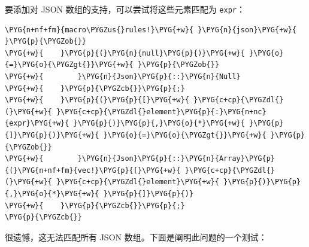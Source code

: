 要添加对 JSON 数组的支持，可以尝试将这些元素匹配为 \texttt{expr}：

\begin{Verbatim}[commandchars=\\\{\},breaklines=true,breakanywhere=true,fontsize=\codefont,xleftmargin=17bp]
\PYG{n+nf+fm}{macro\PYGZus{}rules!}\PYG{+w}{ }\PYG{n}{json}\PYG{+w}{ }\PYG{p}{\PYGZob{}}
\PYG{+w}{    }\PYG{p}{(}\PYG{n}{null}\PYG{p}{)}\PYG{+w}{ }\PYG{o}{=}\PYG{o}{\PYGZgt{}}\PYG{+w}{ }\PYG{p}{\PYGZob{}}
\PYG{+w}{        }\PYG{n}{Json}\PYG{p}{::}\PYG{n}{Null}
\PYG{+w}{    }\PYG{p}{\PYGZcb{}}\PYG{p}{;}
\PYG{+w}{    }\PYG{p}{(}\PYG{p}{[}\PYG{+w}{ }\PYG{c+cp}{\PYGZdl{}(}\PYG{+w}{ }\PYG{c+cp}{\PYGZdl{}element}\PYG{p}{:}\PYG{n+nc}{expr}\PYG{+w}{ }\PYG{p}{)}\PYG{p}{,}\PYG{o}{*}\PYG{+w}{ }\PYG{p}{]}\PYG{p}{)}\PYG{+w}{ }\PYG{o}{=}\PYG{o}{\PYGZgt{}}\PYG{+w}{ }\PYG{p}{\PYGZob{}}
\PYG{+w}{        }\PYG{n}{Json}\PYG{p}{::}\PYG{n}{Array}\PYG{p}{(}\PYG{n+nf+fm}{vec!}\PYG{p}{[}\PYG{+w}{ }\PYG{c+cp}{\PYGZdl{}(}\PYG{+w}{ }\PYG{c+cp}{\PYGZdl{}element}\PYG{+w}{ }\PYG{p}{)}\PYG{p}{,}\PYG{o}{*}\PYG{+w}{ }\PYG{p}{]}\PYG{p}{)}
\PYG{+w}{    }\PYG{p}{\PYGZcb{}}\PYG{p}{;}
\PYG{p}{\PYGZcb{}}
\end{Verbatim}

很遗憾，这无法匹配所有 JSON 数组。下面是阐明此问题的一个测试：

